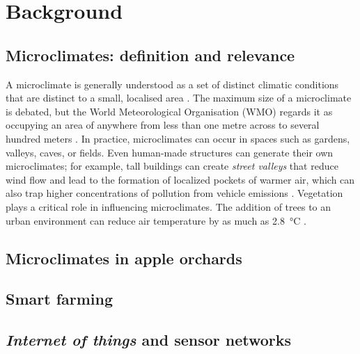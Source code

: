 \section{Background}

\subsection{Microclimates: definition and relevance}

A microclimate is generally understood as a set of distinct climatic conditions
that are distinct to a small, localised area \cite{MetOffice2023}. The maximum
size of a microclimate is debated, but the World Meteorological Organisation
(WMO) regards it as occupying an area of anywhere from less than one metre
across to several hundred meters \cite{wmo2024}.  In practice, microclimates can
occur in spaces such as gardens, valleys, caves, or fields. Even human-made
structures can generate their own microclimates; for example, tall buildings can
create \emph{street valleys} that reduce wind flow and lead to the formation of
localized pockets of warmer air, which can also trap higher concentrations of
pollution from vehicle emissions \cite{yang2023}. Vegetation plays a critical
role in influencing microclimates. The addition of trees to an urban environment
can reduce air temperature by as much as \SI{2.8}{\degreeCelsius}
\cite{lai2019}.

\subsection{Microclimates in apple orchards}

\subsection{Smart farming}

\subsection{\emph{Internet of things} and sensor networks}

